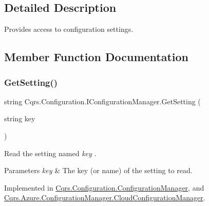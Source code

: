 \subsection{Detailed Description}
Provides access to configuration settings. 



\subsection{Member Function Documentation}
\mbox{\label{interfaceCqrs_1_1Configuration_1_1IConfigurationManager_a9f7b7d4d8c26a0589f01c8a7f69901ef_a9f7b7d4d8c26a0589f01c8a7f69901ef}} 
\subsubsection{\texorpdfstring{Get\+Setting()}{GetSetting()}}
{\footnotesize\ttfamily string Cqrs.\+Configuration.\+I\+Configuration\+Manager.\+Get\+Setting (\begin{DoxyParamCaption}\item[{string}]{key }\end{DoxyParamCaption})}



Read the setting named {\itshape key} . 


\begin{DoxyParams}{Parameters}
{\em key} & The key (or name) of the setting to read.\\
\hline
\end{DoxyParams}


Implemented in \hyperlink{classCqrs_1_1Configuration_1_1ConfigurationManager_ac3e31af665b95b781fee23f577170a63_ac3e31af665b95b781fee23f577170a63}{Cqrs.\+Configuration.\+Configuration\+Manager}, and \hyperlink{classCqrs_1_1Azure_1_1ConfigurationManager_1_1CloudConfigurationManager_a48228b7e2204a2449426de32cd6ecc65_a48228b7e2204a2449426de32cd6ecc65}{Cqrs.\+Azure.\+Configuration\+Manager.\+Cloud\+Configuration\+Manager}.

\mbox{\label{interfaceCqrs_1_1Configuration_1_1IConfigurationManager_ac4478405e3d9e1c97d14953aea4e695b_ac4478405e3d9e1c97d14953aea4e695b}} 

